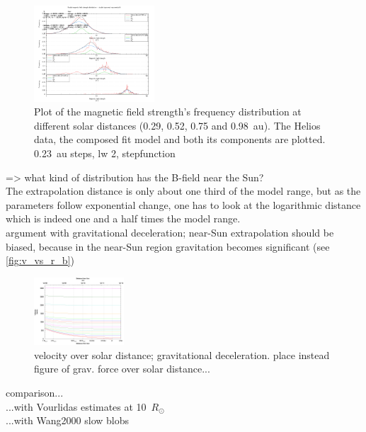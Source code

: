 \begin{figure}[htb]
	\centering
	\includegraphics[width=0.4\textwidth]{images/gnuplots/double_fit_B_freq_r_plot_thesis.png}
	\caption{Plot of the magnetic field strength's frequency distribution at different solar distances (0.29, 0.52, 0.75 and 0.98~au). The Helios data, the composed fit model and both its components are plotted. 0.23~au steps, lw 2, stepfunction}
	\label{fig:double_fit_B_freq_r_plot_thesis}
\end{figure}

=> what kind of distribution has the B-field near the Sun?\\

The extrapolation distance is only about one third of the model range, but as the parameters follow exponential change, one has to look at the logarithmic distance which is indeed one and a half times the model range.\\

argument with gravitational deceleration; near-Sun extrapolation should be biased, because in the near-Sun region gravitation becomes significant (see \autoref{fig:v_vs_r_b})\\
\begin{figure}[htb]
	\centering
	\includegraphics[width=0.3\textwidth]{images/gnuplots/v_vs_r_b.png}
	\caption{velocity over solar distance; gravitational deceleration. place instead figure of grav. force over solar distance...}
	\label{fig:v_vs_r_b}
\end{figure}


comparison...\\
...with Vourlidas estimates at 10~$R_\odot$\\
...with Wang2000 slow blobs\\

